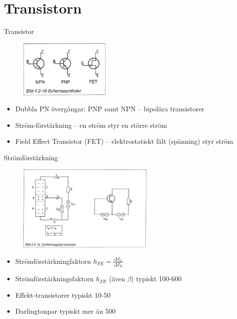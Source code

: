 \documentclass{beamer}
\begin{document}
\section{Transistorn}

\begin{frame}{Transistor}

\begin{figure}[h]
\includegraphics[width=0.4\textwidth]{images/bild_2_2-16}
\end{figure}

\begin{itemize}
  \item Dubbla PN övergångar: PNP samt NPN -- bipolära transistorer
  \item Ström-förstärkning -- en ström styr en större ström
  \item Field Effect Transistor (FET) -- elektrostatiskt fält (spänning) styr ström
\end{itemize}
\end{frame}

\begin{frame}{Strömförstärkning}

\begin{figure}[h]
\includegraphics[width=0.6\textwidth]{images/bild_2_2-18}
\end{figure}

\begin{itemize}
    \item Strömförstärkningfaktorn $h_{FE}=\frac{\Delta I_C}{\Delta I_B}$
    \item Strömförstärkningsfaktorn $h_{FE}$ (även $\beta$) typiskt 100-600
    \item Effekt-transistorer typiskt 10-50
    \item Darlingtonpar typiskt mer än 500
  \end{itemize}
\end{frame}
\end{document}
